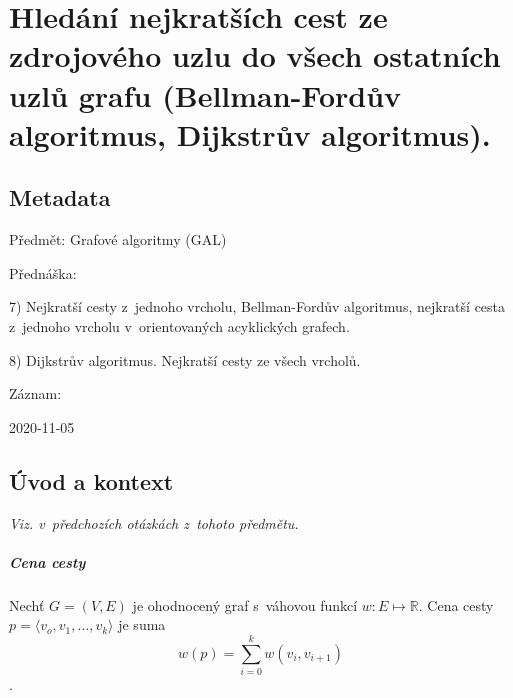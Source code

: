 

\chapter{Hledání nejkratších cest ze zdrojového uzlu do všech ostatních uzlů grafu (Bellman-Fordův algoritmus, Dijkstrův algoritmus).}


\section{Metadata}

\begin{compactitem}
    \item Předmět: Grafové algoritmy (GAL)
    \item Přednáška:
    \begin{compactitem}
        \item 7) Nejkratší cesty z~jednoho vrcholu, Bellman-Fordův algoritmus, nejkratší cesta z~jednoho vrcholu v~orientovaných acyklických grafech.
        \item 8) Dijkstrův algoritmus. Nejkratší cesty ze všech vrcholů.
    \end{compactitem}
    \item Záznam:
    \begin{compactitem}
        \item 2020-11-05
    \end{compactitem}
\end{compactitem}


\section{Úvod a kontext}

\textit{Viz.  v~předchozích otázkách z~tohoto předmětu.}

\paragraph*{Cena cesty} Nechť $G = (V, E)$ je ohodnocený graf s~váhovou funkcí $w: E \mapsto \mathbb{R}$. Cena cesty $p = \langle v_o, v_1, \dots, v_k \rangle$ je suma $$
w(p) = \sum_{i=0}^k w(v_i, v_{i+1})
$$.

